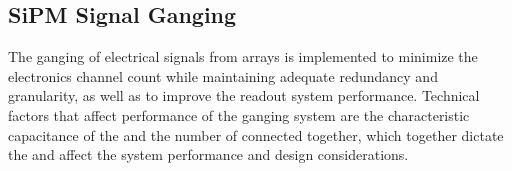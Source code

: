 


\subsection{SiPM Signal Ganging}
\label{sec:pds-design-ganging}

The ganging of electrical signals from  arrays is implemented to minimize the electronics channel count while maintaining adequate redundancy and granularity, as well as to improve the readout system performance.  
Technical factors that affect performance of the ganging system are the characteristic capacitance of the  and the number of  connected together, which together dictate the  and affect the system performance and design considerations.

